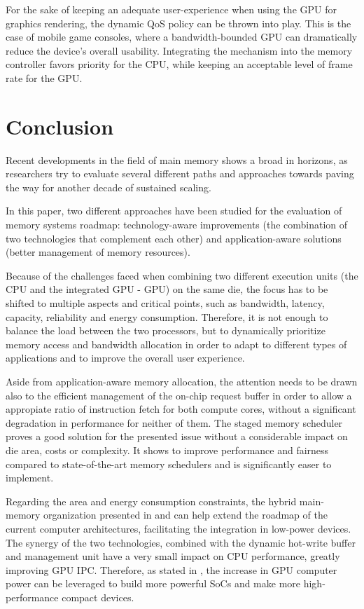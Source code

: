 \documentclass[10pt,journal,compsoc]{IEEEtran}
\begin{document}
For the sake of keeping an adequate user-experience when using the GPU for graphics rendering, the dynamic QoS policy can be thrown into play. This is the case of mobile game consoles, where a bandwidth-bounded GPU can dramatically reduce the device's overall usability. Integrating the mechanism into the memory controller favors priority for the CPU, while keeping an acceptable level of frame rate for the GPU.

\section{Conclusion}
Recent developments in the field of main memory shows a broad in horizons, as researchers try to evaluate several different paths and approaches towards paving the way for another decade of sustained scaling. 

In this paper, two different approaches have been studied for the evaluation of memory systems roadmap: technology-aware improvements (the combination of two technologies that complement each other)  and application-aware solutions (better management of memory resources). 

Because of the challenges faced when combining two different execution units (the CPU and the integrated GPU - GPU) on the same die, the focus has to be shifted to multiple aspects and critical points, such as bandwidth, latency, capacity, reliability and energy consumption. Therefore, it is not enough to balance the load between the two processors, but to dynamically prioritize memory access \cite{LLC} and bandwidth allocation in order to adapt to different types of applications and to improve the overall user experience. 

Aside from application-aware memory allocation, the attention needs to be drawn also to the efficient management of the on-chip request buffer in order to allow a appropiate ratio of instruction fetch for both compute cores, without a significant degradation in performance for neither of them. The  staged memory scheduler proves a good solution for the presented issue without a considerable impact on die area, costs or complexity.  It shows to improve performance and fairness compared to state-of-the-art memory schedulers and is significantly easer to implement\cite{SmS}.

Regarding the area and energy consumption constraints, the hybrid main-memory organization presented in \cite{PRAM} and \cite{PDRAM} can help extend the roadmap of the current computer architectures, facilitating the integration in low-power devices. The synergy of the two technologies, combined with the dynamic hot-write buffer and management unit have a very small impact on CPU performance, greatly improving GPU IPC. Therefore, as stated in \cite{PRAM}, the increase in GPU computer power can be leveraged to build more powerful SoCs and make more high-performance compact devices.
\end{document}
